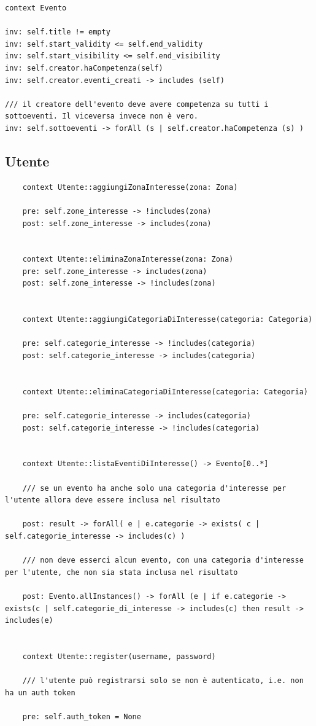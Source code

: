 \documentclass{article}
\begin{document}
\begin{verbatim}
context Evento

inv: self.title != empty
inv: self.start_validity <= self.end_validity
inv: self.start_visibility <= self.end_visibility
inv: self.creator.haCompetenza(self)
inv: self.creator.eventi_creati -> includes (self)

/// il creatore dell'evento deve avere competenza su tutti i sottoeventi. Il viceversa invece non è vero. 
inv: self.sottoeventi -> forAll (s | self.creator.haCompetenza (s) )
\end{verbatim}

\subsection{Utente}

\begin{verbatim}
	context Utente::aggiungiZonaInteresse(zona: Zona)
	
	pre: self.zone_interesse -> !includes(zona)
	post: self.zone_interesse -> includes(zona)
	
	
	context Utente::eliminaZonaInteresse(zona: Zona)
	pre: self.zone_interesse -> includes(zona)
	post: self.zone_interesse -> !includes(zona)
	
	
	context Utente::aggiungiCategoriaDiInteresse(categoria: Categoria)
	
	pre: self.categorie_interesse -> !includes(categoria)
	post: self.categorie_interesse -> includes(categoria)
	
	
	context Utente::eliminaCategoriaDiInteresse(categoria: Categoria)
	
	pre: self.categorie_interesse -> includes(categoria)
	post: self.categorie_interesse -> !includes(categoria)
	
	
	context Utente::listaEventiDiInteresse() -> Evento[0..*]
	
	/// se un evento ha anche solo una categoria d'interesse per l'utente allora deve essere inclusa nel risultato
	
	post: result -> forAll( e | e.categorie -> exists( c | self.categorie_interesse -> includes(c) )
	
	/// non deve esserci alcun evento, con una categoria d'interesse per l'utente, che non sia stata inclusa nel risultato
	
	post: Evento.allInstances() -> forAll (e | if e.categorie -> exists(c | self.categorie_di_interesse -> includes(c) then result -> includes(e)
	
	
	context Utente::register(username, password) 
	
	/// l'utente può registrarsi solo se non è autenticato, i.e. non ha un auth token
	
	pre: self.auth_token = None
\end{verbatim}
\end{document}
